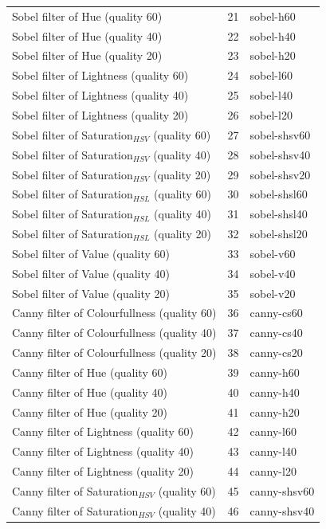 \documentclass[11pt,a4paper,draft]{report}
\begin{document}
\begin{center}
\begin{longtable}{|l|c|l|}
Sobel filter of Hue (quality 60) & 21 & sobel-h60 \\
Sobel filter of Hue (quality 40) & 22 & sobel-h40 \\
Sobel filter of Hue (quality 20) & 23 & sobel-h20 \\
Sobel filter of Lightness (quality 60) & 24 & sobel-l60 \\
Sobel filter of Lightness (quality 40) & 25 & sobel-l40 \\
Sobel filter of Lightness (quality 20) & 26 & sobel-l20 \\
Sobel filter of Saturation$_{HSV}$ (quality 60) & 27 & sobel-shsv60 \\
Sobel filter of Saturation$_{HSV}$ (quality 40) & 28 & sobel-shsv40 \\
Sobel filter of Saturation$_{HSV}$ (quality 20) & 29 & sobel-shsv20 \\
Sobel filter of Saturation$_{HSL}$ (quality 60) & 30 & sobel-shsl60 \\
Sobel filter of Saturation$_{HSL}$ (quality 40) & 31 & sobel-shsl40 \\
Sobel filter of Saturation$_{HSL}$ (quality 20) & 32 & sobel-shsl20 \\
Sobel filter of Value (quality 60) & 33 & sobel-v60 \\
Sobel filter of Value (quality 40) & 34 & sobel-v40 \\
Sobel filter of Value (quality 20) & 35 & sobel-v20 \\
Canny filter of Colourfullness (quality 60) & 36 & canny-cs60 \\
Canny filter of Colourfullness (quality 40) & 37 & canny-cs40 \\
Canny filter of Colourfullness (quality 20) & 38 & canny-cs20 \\
Canny filter of Hue (quality 60) & 39 & canny-h60 \\
Canny filter of Hue (quality 40) & 40 & canny-h40 \\
Canny filter of Hue (quality 20) & 41 & canny-h20 \\
Canny filter of Lightness (quality 60) & 42 & canny-l60 \\
Canny filter of Lightness (quality 40) & 43 & canny-l40 \\
Canny filter of Lightness (quality 20) & 44 & canny-l20 \\
Canny filter of Saturation$_{HSV}$ (quality 60) & 45 & canny-shsv60 \\
Canny filter of Saturation$_{HSV}$ (quality 40) & 46 & canny-shsv40 \\

\end{longtable}
\end{center}
\end{document}
